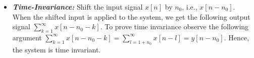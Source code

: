 \documentclass[10pt,a4paper, margin=1in]{article}
\begin{document}
\begin{enumerate}
\begin{enumerate}
\begin{itemize}
		\item \textbf{\textit{Time-Invariance:}} Shift the input signal $x[n]$ by $n_0$, i.e., $x[n-n_0]$. When the shifted input is applied to the system, we get the following output signal $\sum_{k=1}^{\infty}x[n-n_0-k]$. To prove time invariance observe the following argument $\sum_{k=1}^{\infty}x[n-n_0-k] = \sum_{l=1+n_0}^{\infty}x[n-l] = y[n-n_0]$. Hence, the system is time invariant.
	\end{itemize}
    \end{enumerate}

\end{enumerate}
\end{document}
